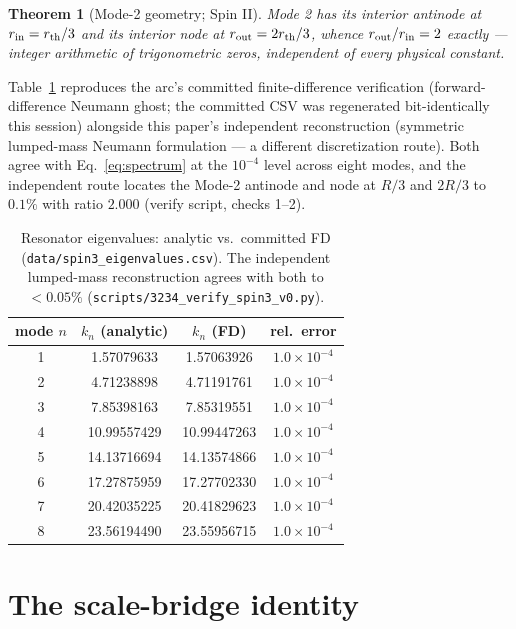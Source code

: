 \documentclass[12pt]{article}
\newcommand{\rth}{r_{\rm th}}
\newcommand{\rin}{r_{\rm in}}
\newcommand{\rout}{r_{\rm out}}
\newtheorem{theorem}{Theorem}
\begin{document}
\begin{theorem}[Mode-2 geometry; Spin II]
Mode 2 has its interior antinode at $\rin = \rth/3$ and its interior
node at $\rout = 2\rth/3$, whence $\rout/\rin = 2$ exactly ---
integer arithmetic of trigonometric zeros, independent of every
physical constant.
\end{theorem}

Table~\ref{tab:fd} reproduces the arc's committed finite-difference
verification (forward-difference Neumann ghost; the committed CSV was
regenerated bit-identically this session) alongside this paper's
independent reconstruction (symmetric lumped-mass Neumann formulation
--- a different discretization route).  Both agree with
Eq.~\eqref{eq:spectrum} at the $10^{-4}$ level across eight modes, and
the independent route locates the Mode-2 antinode and node at $R/3$ and
$2R/3$ to $0.1\%$ with ratio $2.000$ (verify script, checks 1--2).

\begin{table}[h]
\centering
\caption{Resonator eigenvalues: analytic vs.\ committed FD
(\texttt{data/spin3\_eigenvalues.csv}).  The independent lumped-mass
reconstruction agrees with both to $<0.05\%$
(\texttt{scripts/3234\_verify\_spin3\_v0.py}).}
\label{tab:fd}
\begin{tabular}{cccc}
\toprule
mode $n$ & $k_n$ (analytic) & $k_n$ (FD) & rel.\ error \\
\midrule
1 & 1.57079633 & 1.57063926 & $1.0\times10^{-4}$ \\
2 & 4.71238898 & 4.71191761 & $1.0\times10^{-4}$ \\
3 & 7.85398163 & 7.85319551 & $1.0\times10^{-4}$ \\
4 & 10.99557429 & 10.99447263 & $1.0\times10^{-4}$ \\
5 & 14.13716694 & 14.13574866 & $1.0\times10^{-4}$ \\
6 & 17.27875959 & 17.27702330 & $1.0\times10^{-4}$ \\
7 & 20.42035225 & 20.41829623 & $1.0\times10^{-4}$ \\
8 & 23.56194490 & 23.55956715 & $1.0\times10^{-4}$ \\
\bottomrule
\end{tabular}
\end{table}

\section{The scale-bridge identity}
\label{sec:bridge}
\end{document}
